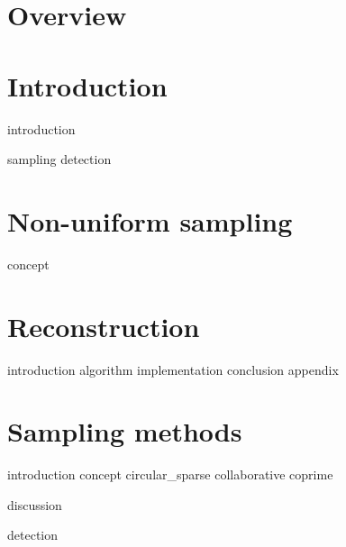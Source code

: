 \documentclass[a4paper, openany, oneside]{memoir}
\begin{document}
\chapter{Overview}

\chapter{Introduction}
\label{cha:overview}
{introduction}

{sampling}
{detection}


\chapter{Non-uniform sampling}
\label{cha:sampling}

{concept}

\chapter{Reconstruction}
\label{cha:reconstruction}

{introduction}
{algorithm}
{implementation}
{conclusion}
{appendix}

\chapter{Sampling methods}
\label{cha:sampling_methods}

{introduction}
{concept}
{circular_sparse}
{collaborative}
{coprime}

{discussion}

{detection}
\end{document}
